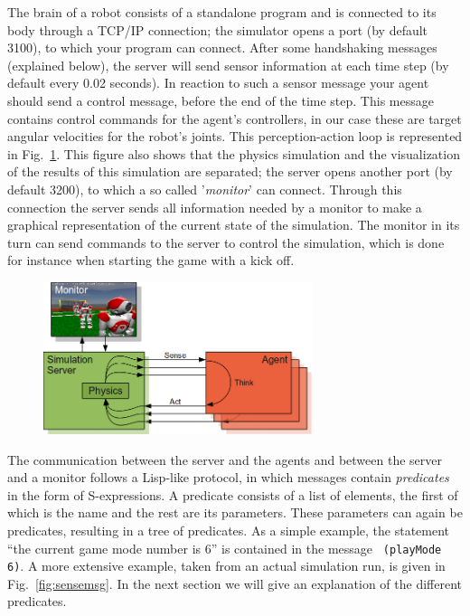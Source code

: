 The brain of a robot consists of a standalone program and is connected
to its body through a TCP/IP connection; the simulator opens a port
(by default 3100), to which your program can connect. After some
handshaking messages (explained below), the server will send sensor
information at each time step (by default every 0.02 seconds). In
reaction to such a sensor message your agent should send a control
message, before the end of the time step. This message contains
control commands for the agent's controllers, in our case these are
target angular velocities for the robot's joints. This
perception-action loop is represented in
Fig.~\ref{fig:simulator}. This figure also shows that the physics
simulation and the visualization of the results of this simulation are
separated; the server opens another port (by default 3200), to which a
so called '\emph{monitor}' can connect. Through this connection the
server sends all information needed by a monitor to make a graphical
representation of the current state of the simulation. The monitor in
its turn can send commands to the server to control the simulation,
which is done for instance when starting the game with a kick off.

\begin{figure}[t]
\begin{center}
	\includegraphics[width=0.70\textwidth]{simulator}
	\label{fig:simulator}
\end{center}
\end{figure}

The communication between the server and the agents and between the
server and a monitor follows a Lisp-like protocol, in which messages
contain \emph{predicates} in the form of {S-expressions}. A predicate
consists of a list of elements, the first of which is the name and the
rest are its parameters. These parameters can again be predicates,
resulting in a tree of predicates. As a simple example, the statement
``the current game mode number is 6'' is contained in the message {\tt
  (playMode 6)}. A more extensive example, taken from an actual
simulation run, is given in Fig.~\ref{fig:sensemsg}. In the next
section we will give an explanation of the different predicates.

